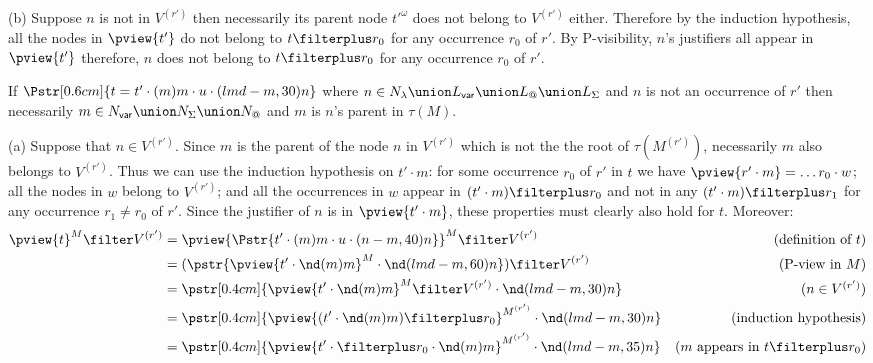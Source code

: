\begin{compactitem}
    (b) Suppose $n$ is not in $V^{(r')}$ then necessarily its parent node $t'^\omega$ does not belong to $V^{(r')}$ either.
    Therefore by the induction hypothesis, all the nodes in $\pview{t'}$ do not belong to
    $t\filterplus r_0$ for any occurrence $r_0$ of $r'$. By P-visibility, $n$'s justifiers all appear in $\pview{t'}$ therefore, $n$ does not belong to $t\filterplus r_0$ for any occurrence $r_0$ of $r'$.


    \item If $\Pstr[0.6cm]{ t =  t' \cdot (m){m} \cdot u \cdot (lmd-m,30){n} }$
    where $n \in N_\lambda \union L_{\sf var} \union L_@ \union
    L_\Sigma$ and $n$ is not an occurrence of $r'$ then necessarily $m\in N_{\sf var} \union
    N_\Sigma \union N_@$ and $m$ is $n$'s parent in $\tau(M)$.

    (a) Suppose that $n\in V^{(r')}$. Since $m$ is the parent of
    the node $n$ in $V^{(r')}$ which is not the the root of
    $\tau(M^{(r')})$, necessarily $m$ also belongs to
    $V^{(r')}$. Thus we can use the induction hypothesis on $t' \cdot m$: for some occurrence $r_0$
     of $r'$ in $t$ we have
    $\pview{r' \cdot m} = \ldots r_0 \cdot w$; all the
    nodes in $w$ belong to $V^{(r')}$; and all the
    occurrences in $w$ appear in $(t'\cdot m)\filterplus r_0$
    and not in any $(t'\cdot m)\filterplus r_1$ for any occurrence $r_1\neq r_0$ of $r'$.
    Since the justifier of $n$ is in $\pview{t' \cdot  m}$, these properties must clearly also hold for $t$.
    Moreover:
            \begin{align*}
            \pview{t}^M \filter  V^{(r')}            &= \pview{\Pstr{t' \cdot (m){m} \cdot u \cdot (n-m,40){n}}}^M \filter  V^{(r')}
                & (\mbox{definition of } t)\\
            &= (\pstr{\pview{t' \cdot \nd(m){m} }^M \cdot \nd(lmd-m,60){n}}) \filter  V^{(r')}
                & (\mbox{P-view in $M$}) \\
            &= \pstr[0.4cm]{ \pview{t' \cdot \nd(m){m} }^M \filter V^{(r')} \cdot \nd(lmd-m,30){n} }
                & (\mbox{$n \in V^{(r')}$}) \\
            &= \pstr[0.4cm]{ \pview{(t' \cdot \nd(m){m})\filterplus r_0}^{M^{(r')}}  \cdot  \nd(lmd-m,30){n} }
                & \mbox{(induction hypothesis)} \\
            &= \pstr[0.4cm]{ \pview{t' \cdot \filterplus r_0 \cdot \nd(m){m}}^{M^{(r')}}  \cdot  \nd(lmd-m,35){n} }
                & \mbox{($m$ appears in $t\filterplus r_0$)} \\

\end{align*}
\end{compactitem}
